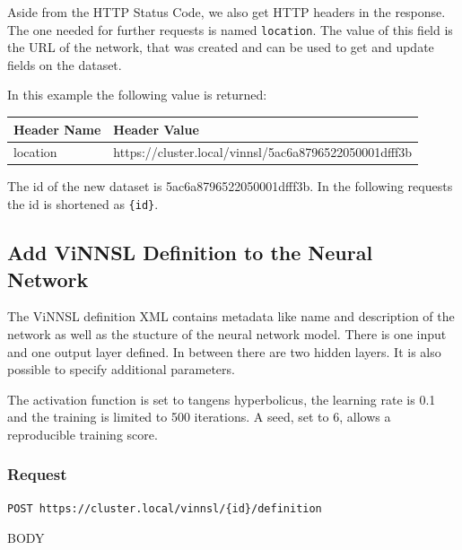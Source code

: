 Aside from the HTTP Status Code, we also get HTTP headers in the
response. The one needed for further requests is named
\texttt{location}. The value of this field is the URL of the network,
that was created and can be used to get and update fields on the
dataset.

In this example the following value is returned:

\begin{longtable}[]{@{}ll@{}}
\toprule
Header Name & Header Value\tabularnewline
\midrule
\endhead
location &
https://cluster.local/vinnsl/5ac6a8796522050001dfff3b\tabularnewline
\bottomrule
\end{longtable}

The id of the new dataset is 5ac6a8796522050001dfff3b. In the following
requests the id is shortened as \texttt{\{id\}}.

\subsection{Add ViNNSL Definition to the Neural
Network}\label{add-vinnsl-definition-to-the-neural-network-1}

The ViNNSL definition XML contains metadata like name and description of
the network as well as the stucture of the neural network model. There
is one input and one output layer defined. In between there are two
hidden layers. It is also possible to specify additional parameters.

The activation function is set to tangens hyperbolicus, the learning
rate is 0.1 and the training is limited to 500 iterations. A seed, set
to 6, allows a reproducible training score.

\subsubsection{Request}\label{request-4}

\begin{verbatim}
POST https://cluster.local/vinnsl/{id}/definition
\end{verbatim}

BODY

